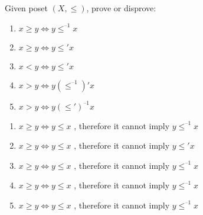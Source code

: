 \documentclass[12pt]{article}
\newenvironment{solution}[2][Solution]{ \begin{trivlist}
\item[\hskip \labelsep {\bfseries #1}]}{\end{trivlist}}
\newenvironment{problem}[2][Problem]{\begin{trivlist}
\item[\hskip \labelsep {\bfseries #1}\hskip \labelsep {\bfseries #2.}]}{\end{trivlist}}
\begin{document}
\begin{problem}{9}
 Given poset $(X, \le)$, prove or disprove:
\item[]
\begin{enumerate}[label=\alph*)]
    \item $x \ge y \Leftrightarrow y \le^{\text{--}1} x$
    \item $x \ge y \Leftrightarrow y \le' x$
    \item $x < y \Leftrightarrow y \le' x$
    \item $x > y \Leftrightarrow y (\le^{\text{--}1})' x$
    \item $x > y \Leftrightarrow y (\le')^{\text{--}1} x$
\end{enumerate}
\end{problem}
\begin{solution}{9}
\item[]
\begin{enumerate}[label=\alph*)]
    \item $x \ge y \Leftrightarrow y \le x$ , therefore it cannot imply $y \le^{\text{--}1} x$
    \item $x \ge y \Leftrightarrow y \le x$ , therefore it cannot imply $y \le' x$
    \item $x \ge y \Leftrightarrow y \le x$ , therefore it cannot imply $y \le^{\text{--}1} x$
    \item $x \ge y \Leftrightarrow y \le x$ , therefore it cannot imply $y \le^{\text{--}1} x$
    \item $x \ge y \Leftrightarrow y \le x$ , therefore it cannot imply $y \le^{\text{--}1} x$
\end{enumerate}
\end{solution}
\end{document}
